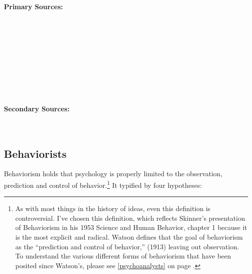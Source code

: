 \begin{refsection}
\paragraph{Primary Sources:}
\label{primarysources:}

~\citep{Freud:QdOvAgyZ}

~\citep{Freud:vJ1P2PRd}

~\citep{Freud:1994wo}

~\citep{Jung:cpLzoBjv}

~\citep{Jung:1953uoa}

\paragraph{Secondary Sources:}
\label{secondarysources:}

~\citep{Arieti:1974tm}

\subsection{Behaviorists}
\label{behaviorists}

Behaviorism holds that psychology is properly limited to the observation, prediction and control of behavior.\footnote{As with most things in the history of ideas, even this definition is controversial. I've chosen this definition, which reflects Skinner's presentation of Behaviorism in his 1953 Science and Human Behavior, chapter 1 because it is the most explicit and radical. Watson defines that the goal of behaviorism as the ``prediction and control of behavior,'' (1913) leaving out observation. To understand the various different forms of behaviorism that have been posited since Watson's, please see \ref{psychoanalysts} on page \pageref{psychoanalysts}.} It typified by four hypotheses:


\end{refsection}

